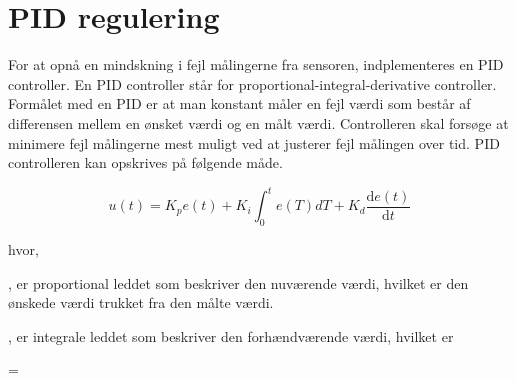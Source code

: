 \section{PID regulering}
For at opnå en mindskning i fejl målingerne fra sensoren, indplementeres en PID controller. En PID controller står for proportional-integral-derivative controller. Formålet med en PID er at man konstant måler en fejl værdi som består af differensen mellem en ønsket værdi og en målt værdi. Controlleren skal forsøge at minimere fejl målingerne mest muligt ved at justerer fejl målingen over tid.\newline
\newline
PID controlleren kan opskrives på følgende måde.

\begin{equation} 
u(t) = K_p e(t) + K_i\int_{0}^{t}e(T)dT + K_d\frac{\mathrm{d} e(t)}{\mathrm{d} t}
\end{equation}

hvor, 

, er proportional leddet som beskriver den nuværende værdi, hvilket er den ønskede værdi trukket fra den målte værdi. 

, er integrale leddet som beskriver den forhændværende værdi, hvilket er  

 = 